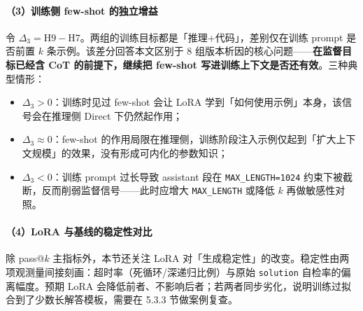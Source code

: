 \paragraph{（3）训练侧 few-shot 的独立增益}
令 $\Delta_3 = \mathrm{H9} - \mathrm{H7}$。两组的训练目标都是「推理+代码」，差别仅在训练 prompt 是否前置 $k$ 条示例。该差分回答本文区别于 8 组版本析因的核心问题——\textbf{在监督目标已经含 CoT 的前提下，继续把 few-shot 写进训练上下文是否还有效}。三种典型情形：
\begin{itemize}
    \item $\Delta_3 > 0$：训练时见过 few-shot 会让 LoRA 学到「如何使用示例」本身，该信号会在推理侧 Direct 下仍然起作用；
    \item $\Delta_3 \approx 0$：few-shot 的作用局限在推理侧，训练阶段注入示例仅起到「扩大上下文规模」的效果，没有形成可内化的参数知识；
    \item $\Delta_3 < 0$：训练 prompt 过长导致 assistant 段在 \texttt{MAX\_LENGTH=1024} 约束下被截断，反而削弱监督信号——此时应增大 \texttt{MAX\_LENGTH} 或降低 $k$ 再做敏感性对照。
\end{itemize}

\paragraph{（4）LoRA 与基线的稳定性对比}
除 pass@$k$ 主指标外，本节还关注 LoRA 对「生成稳定性」的改变。稳定性由两项观测量间接刻画：超时率（死循环/深递归比例）与原始 \texttt{solution} 自检率的偏离幅度。预期 LoRA 会降低前者、不影响后者；若两者同步劣化，说明训练过拟合到了少数长解答模板，需要在 5.3.3 节做案例复查。
